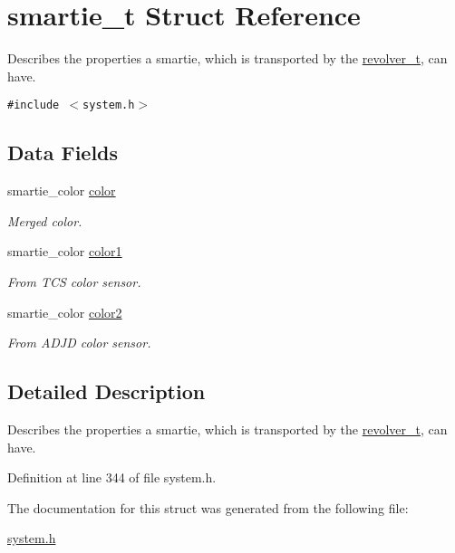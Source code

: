 \hypertarget{structsmartie__t}{
\section{smartie\_\-t Struct Reference}
\label{structsmartie__t}
}
Describes the properties a smartie, which is transported by the \hyperlink{structrevolver__t}{revolver\_\-t}, can have.  


{\tt \#include $<$system.h$>$}

\subsection*{Data Fields}
\begin{CompactItemize}
\item 
\hypertarget{structsmartie__t_d6404bb9745efb547327916cfa322788}{
smartie\_\-color \hyperlink{structsmartie__t_d6404bb9745efb547327916cfa322788}{color}}
\label{structsmartie__t_d6404bb9745efb547327916cfa322788}

\begin{CompactList}\small\item\em Merged color. \item\end{CompactList}\item 
\hypertarget{structsmartie__t_d52ae51f3ecaf7900f1930f2febc22f8}{
smartie\_\-color \hyperlink{structsmartie__t_d52ae51f3ecaf7900f1930f2febc22f8}{color1}}
\label{structsmartie__t_d52ae51f3ecaf7900f1930f2febc22f8}

\begin{CompactList}\small\item\em From TCS color sensor. \item\end{CompactList}\item 
\hypertarget{structsmartie__t_db08258411e1fd0025f16b6e2ea205be}{
smartie\_\-color \hyperlink{structsmartie__t_db08258411e1fd0025f16b6e2ea205be}{color2}}
\label{structsmartie__t_db08258411e1fd0025f16b6e2ea205be}

\begin{CompactList}\small\item\em From ADJD color sensor. \item\end{CompactList}\end{CompactItemize}


\subsection{Detailed Description}
Describes the properties a smartie, which is transported by the \hyperlink{structrevolver__t}{revolver\_\-t}, can have. 

Definition at line 344 of file system.h.

The documentation for this struct was generated from the following file:\begin{CompactItemize}
\item 
\hyperlink{system_8h}{system.h}\end{CompactItemize}

